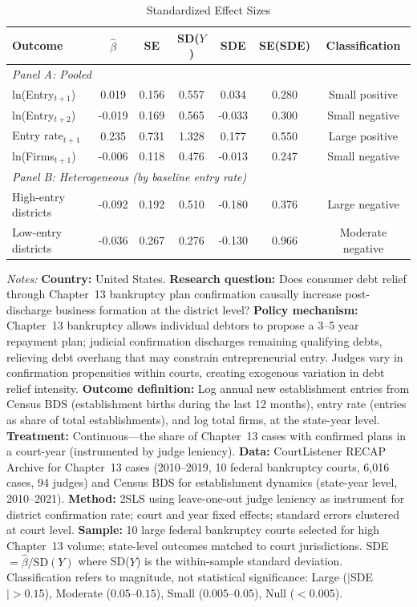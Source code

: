 \begin{table}[htbp]
\centering
\caption{Standardized Effect Sizes}
\label{tab:sde}
\begin{threeparttable}
\begin{tabular}{lcccccc}
\toprule
Outcome & $\hat{\beta}$ & SE & SD($Y$) & SDE & SE(SDE) & Classification \\
\midrule
\multicolumn{7}{l}{\textit{Panel A: Pooled}} \\[3pt]
ln(Entry$_{t+1}$) & 0.019 & 0.156 & 0.557 & 0.034 & 0.280 & Small positive \\
ln(Entry$_{t+2}$) & -0.019 & 0.169 & 0.565 & -0.033 & 0.300 & Small negative \\
Entry rate$_{t+1}$ & 0.235 & 0.731 & 1.328 & 0.177 & 0.550 & Large positive \\
ln(Firms$_{t+1}$) & -0.006 & 0.118 & 0.476 & -0.013 & 0.247 & Small negative \\
\midrule
\multicolumn{7}{l}{\textit{Panel B: Heterogeneous (by baseline entry rate)}} \\[3pt]
High-entry districts & -0.092 & 0.192 & 0.510 & -0.180 & 0.376 & Large negative \\
Low-entry districts & -0.036 & 0.267 & 0.276 & -0.130 & 0.966 & Moderate negative \\
\bottomrule
\end{tabular}
\begin{tablenotes}
\small
\item \textit{Notes:} \textbf{Country:} United States. \textbf{Research question:} Does consumer debt relief through Chapter~13 bankruptcy plan confirmation causally increase post-discharge business formation at the district level? \textbf{Policy mechanism:} Chapter~13 bankruptcy allows individual debtors to propose a 3--5 year repayment plan; judicial confirmation discharges remaining qualifying debts, relieving debt overhang that may constrain entrepreneurial entry. Judges vary in confirmation propensities within courts, creating exogenous variation in debt relief intensity. \textbf{Outcome definition:} Log annual new establishment entries from Census BDS (establishment births during the last 12 months), entry rate (entries as share of total establishments), and log total firms, at the state-year level. \textbf{Treatment:} Continuous---the share of Chapter~13 cases with confirmed plans in a court-year (instrumented by judge leniency). \textbf{Data:} CourtListener RECAP Archive for Chapter~13 cases (2010--2019, 10 federal bankruptcy courts, 6,016 cases, 94 judges) and Census BDS for establishment dynamics (state-year level, 2010--2021). \textbf{Method:} 2SLS using leave-one-out judge leniency as instrument for district confirmation rate; court and year fixed effects; standard errors clustered at court level. \textbf{Sample:} 10 large federal bankruptcy courts selected for high Chapter~13 volume; state-level outcomes matched to court jurisdictions. SDE $= \hat{\beta} / \text{SD}(Y)$ where SD($Y$) is the within-sample standard deviation. Classification refers to magnitude, not statistical significance: Large ($|$SDE$| > 0.15$), Moderate ($0.05$--$0.15$), Small ($0.005$--$0.05$), Null ($< 0.005$).

\end{tablenotes}
\end{threeparttable}
\end{table}
